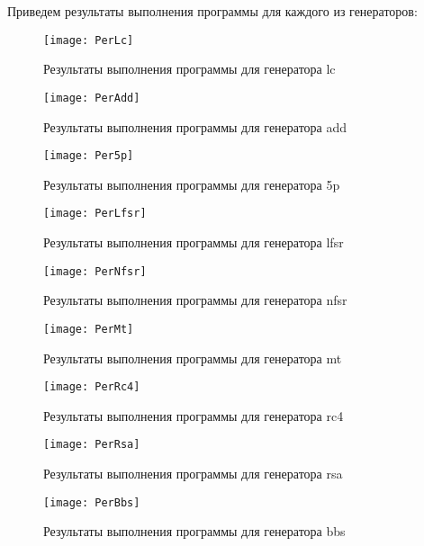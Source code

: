 \documentclass[bachelor, och, coursework]{shiza}
\begin{document}
	Приведем результаты выполнения программы для каждого из генераторов:
	
	\begin{figure}[H]
		\centering
		\texttt{[image: PerLc]}
		\caption{Результаты выполнения программы для генератора lc}
		\label{fig:PerLc}
	\end{figure}
	
	\begin{figure}[H]
		\centering
		\texttt{[image: PerAdd]}
		\caption{Результаты выполнения программы для генератора add}
		\label{fig:PerAdd}
	\end{figure}
	
	\begin{figure}[H]
		\centering
		\texttt{[image: Per5p]}
		\caption{Результаты выполнения программы для генератора 5p}
		\label{fig:Per5p}
	\end{figure}	
	
	\begin{figure}[H]
		\centering
		\texttt{[image: PerLfsr]}
		\caption{Результаты выполнения программы для генератора lfsr}
		\label{fig:PerLfsr}
	\end{figure}
	
	\begin{figure}[H]
		\centering
		\texttt{[image: PerNfsr]}
		\caption{Результаты выполнения программы для генератора nfsr}
		\label{fig:PerNfsr}
	\end{figure}
	
	\begin{figure}[H]
		\centering
		\texttt{[image: PerMt]}
		\caption{Результаты выполнения программы для генератора mt}
		\label{fig:PerMt}
	\end{figure}		
	
	\begin{figure}[H]
		\centering
		\texttt{[image: PerRc4]}
		\caption{Результаты выполнения программы для генератора rc4}
		\label{fig:PerRc4}
	\end{figure}
	
	\begin{figure}[H]
		\centering
		\texttt{[image: PerRsa]}
		\caption{Результаты выполнения программы для генератора rsa}
		\label{fig:PerRsa}
	\end{figure}
	
	\begin{figure}[H]
		\centering
		\texttt{[image: PerBbs]}
		\caption{Результаты выполнения программы для генератора bbs}
		\label{fig:PerBbs}
	\end{figure}
	
\end{document}
